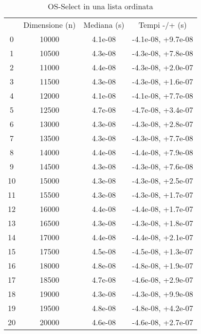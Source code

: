 \begin{table}
\centering
\caption{OS-Select in una lista ordinata}
\label{OS-Select in una lista ordinata}
\begin{adjustbox}{width=1\textwidth/2}
\begin{tabular}{|c|c|c|c|}
\hline
 & Dimensione (n) & Mediana (s) & Tempi -/+ (s) \\
0 & 10000 & 4.1e-08 & -4.1e-08, +9.7e-08 \\
\cline{1-4}
1 & 10500 & 4.3e-08 & -4.3e-08, +7.8e-08 \\
\cline{1-4}
2 & 11000 & 4.4e-08 & -4.3e-08, +2.0e-07 \\
\cline{1-4}
3 & 11500 & 4.3e-08 & -4.3e-08, +1.6e-07 \\
\cline{1-4}
4 & 12000 & 4.1e-08 & -4.1e-08, +7.7e-08 \\
\cline{1-4}
5 & 12500 & 4.7e-08 & -4.7e-08, +3.4e-07 \\
\cline{1-4}
6 & 13000 & 4.3e-08 & -4.3e-08, +2.8e-07 \\
\cline{1-4}
7 & 13500 & 4.3e-08 & -4.3e-08, +7.7e-08 \\
\cline{1-4}
8 & 14000 & 4.4e-08 & -4.4e-08, +7.9e-08 \\
\cline{1-4}
9 & 14500 & 4.3e-08 & -4.3e-08, +7.6e-08 \\
\cline{1-4}
10 & 15000 & 4.3e-08 & -4.3e-08, +2.5e-07 \\
\cline{1-4}
11 & 15500 & 4.3e-08 & -4.3e-08, +1.7e-07 \\
\cline{1-4}
12 & 16000 & 4.4e-08 & -4.4e-08, +1.7e-07 \\
\cline{1-4}
13 & 16500 & 4.3e-08 & -4.3e-08, +1.8e-07 \\
\cline{1-4}
14 & 17000 & 4.4e-08 & -4.4e-08, +2.1e-07 \\
\cline{1-4}
15 & 17500 & 4.5e-08 & -4.5e-08, +1.3e-07 \\
\cline{1-4}
16 & 18000 & 4.8e-08 & -4.8e-08, +1.9e-07 \\
\cline{1-4}
17 & 18500 & 4.7e-08 & -4.6e-08, +2.9e-07 \\
\cline{1-4}
18 & 19000 & 4.3e-08 & -4.3e-08, +9.9e-08 \\
\cline{1-4}
19 & 19500 & 4.8e-08 & -4.8e-08, +4.2e-07 \\
\cline{1-4}
20 & 20000 & 4.6e-08 & -4.6e-08, +2.7e-07 \\
\cline{1-4}
\end{tabular}
\end{adjustbox}
\end{table}

